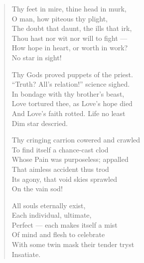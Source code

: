 
\begin{verse}
  Thy feet in mire, thine head in murk, \\
  \hspace{1em} O man, how piteous thy plight, \\
  The doubt that daunt, the ills that irk, \\
  \hspace{1em} Thou  hast nor wit nor will to fight --- \\
  How hope in heart, or worth in work? \\
  \hspace{1em} No star in sight!

  Thy Gods proved puppets of the priest. \\
  \hspace{1em} \enquote{Truth? All's relation!} science sighed. \\
  In bondage with thy brother's beast, \\
  \hspace{1em} Love tortured thee, as Love's hope died \\
  And Love's faith rotted. Life no least \\
  \hspace{1em} Dim star descried.

  Thy cringing carrion cowered and crawled \\
  \hspace{1em}To find itself a chance-cast clod \\
  Whose Pain was purposeless; appalled \\
  \hspace{1em}That aimless accident thus trod \\
  Its agony, that void skies sprawled \\
  \hspace{1em}On the vain sod!

  All souls eternally exist, \\
  \hspace{1em}Each individual, ultimate, \\
  Perfect --- each makes itself a mist \\
  \hspace{1em}Of mind and flesh to celebrate \\
  With some twin mask their tender tryst \\
  \hspace{1em}Insatiate.


\end{verse}
